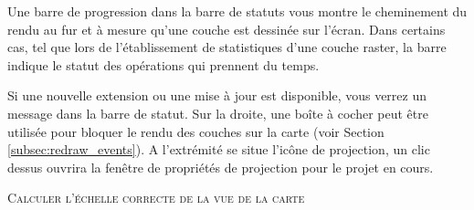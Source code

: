 Une barre de progression dans la barre de statuts vous montre le cheminement du rendu au fur et \`a mesure qu'une couche est dessin\'ee sur l'\'ecran. Dans certains cas, tel que lors de l'\'etablissement de statistiques d'une couche raster, la barre indique le statut des op\'erations qui prennent du temps.

Si une nouvelle extension ou une mise \`a jour est disponible, vous verrez un message dans la barre de statut. Sur la droite, une bo\^ite \`a cocher peut \^etre utilis\'ee pour bloquer le rendu des couches sur la carte (voir Section \ref{subsec:redraw_events}). A l'extr\'emit\'e se situe l'ic\^one de projection,  un clic dessus ouvrira la fen\^etre de propri\'et\'es de projection pour le projet en cours.


\begin{Tip}\caption{\textsc{Calculer l'\'echelle correcte de la vue de la carte}}
\end{Tip}

%
%
%

